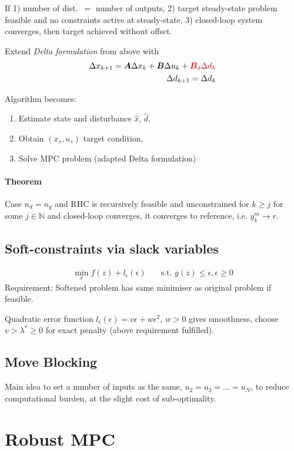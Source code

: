 \documentclass[landscape,a4paper,8pt]{scrartcl}
\newcommand{\remph}[1]{{\textcolor{red}{#1}}}
\newcommand\vA{\bm{A}}
\newcommand\vB{\bm{B}}
\begin{document}
\begin{multicols*}{3}
If 1) number of dist.\ $=$ number of outputs, 2) target steady-state problem feasible and no constraints active at steady-state, 3) closed-loop system converges, then target achieved without offset.

Extend \emph{Delta formulation} from above with
\begin{align*}
\Delta x_{k+1} = \vA\Delta x_k + \vB\Delta u_k + \remph{\vB_d \Delta d_k} \\
\Delta d_{k+1} = \Delta d_k
\end{align*}

Algorithm becomes:
\begin{enumerate}
\item Estimate state and disturbance $\hat x$, $\hat d$,
\item Obtain $(x_s, u_s)$ target condition,
\item Solve MPC problem (adapted Delta formulation)
\end{enumerate}

\paragraph{Theorem}
Case $n_d = n_y$ and RHC is recursively feasible and unconstrained for $k \geq j$ for some $j \in \mathbb{N}$ and closed-loop converges, it converges to reference, i.e. $y_k^m \to r$.

\subsection{Soft-constraints via slack variables}
\begin{align*}
\min_x f(z) + l_\epsilon(\epsilon) & \quad \text{s.t.\ } g(z) \leq \epsilon, \epsilon \geq 0
\end{align*}
Requirement: Softened problem has same minimiser as original problem if feasible.

Quadratic error function $l_\epsilon(\epsilon) = v\epsilon + w\epsilon^2$, $w > 0$ gives smoothness, choose $v > \lambda^* \geq 0$ for exact penalty (above requirement fulfilled).

\subsection{Move Blocking}
Main idea to set a number of inputs as the same, $u_2 = u_3 = \dots = u_N$, to reduce computational burden, at the slight cost of sub-optimality.

\section{Robust MPC}

\end{multicols*}
\end{document}
